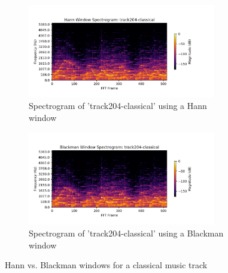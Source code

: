 \documentclass[11pt,a4paper]{article}
\begin{document}
\begin{figure}[tb]
	\centering
	\begin{subfigure}[t]{\hsize}
		\centering
		\includegraphics[width=0.9\textwidth]{powerHann_track204-classical}
		\caption{Spectrogram of 'track204-classical' using a Hann window}
		\label{fig:hann_classical}
	\end{subfigure}
	\begin{subfigure}[t]{\hsize}
		\centering
		\includegraphics[width=0.9\textwidth]{powerBlack_track204-classical}
		\caption{Spectrogram of 'track204-classical' using a Blackman window}
		\label{fig:black_classical}
	\end{subfigure}
	\caption{Hann vs. Blackman windows for a classical music track}
	\label{fig:windows_classical}
\end{figure}
\clearpage
\end{document}
